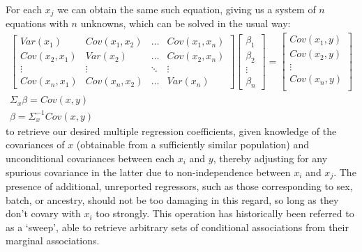 \documentclass[12pt]{article}
\begin{document}
For each $x_j$ we can obtain the same such equation, giving us a system of $n$ equations with $n$ unknowns, which can be solved in the usual way:
\begin{align}
\begin{bmatrix}
    Var(x_1) & Cov(x_1,x_2) & \dots  & Cov(x_1,x_n) \\
    Cov(x_2,x_1) & Var(x_2) & \dots  & Cov(x_2,x_n) \\
    \vdots & \vdots & \ddots & \vdots \\
    Cov(x_n,x_1) & Cov(x_n,x_2) & \dots  & Var(x_n)
\end{bmatrix}
\begin{bmatrix}
    \beta_1 \\
    \beta_2 \\
    \vdots \\
    \beta_n
\end{bmatrix}
=
\begin{bmatrix}
   Cov(x_1, y) \\
   Cov(x_2, y) \\
    \vdots \\
   Cov(x_n, y) \\
\end{bmatrix}  \label{eq25}\\
\Sigma_x\beta = Cov(x, y) \label{eq26}\\
\beta = \Sigma_x^{-1}Cov(x, y) \label{eq27}
\end{align}
to retrieve our desired multiple regression coefficients, given knowledge of the covariances of $x$ (obtainable from a sufficiently similar population) and unconditional covariances between each $x_i$ and $y$, thereby adjusting for any spurious covariance in the latter due to non-independence between $x_i$ and $x_j$. The presence of additional, unreported regressors, such as those corresponding to sex, batch, or ancestry, should not be too damaging in this regard, so long as they don't covary with $x_i$ too strongly. This operation has historically been referred to as a `sweep', able to retrieve arbitrary sets of conditional associations from their marginal associations.\\
\end{document}
